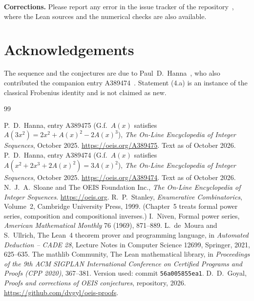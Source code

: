\documentclass[11pt,a4paper]{article}
\theoremstyle{definition}
\theoremstyle{remark}
\newcommand{\para}[1]{\par\medskip\noindent\textbf{#1}\enspace}
\begin{document}
\para{Corrections.} Please report any error in the issue tracker of the repository~\cite{repo}, where the Lean sources and the numerical checks are also
available.

\section*{Acknowledgements}
The sequence and the conjectures are due to Paul~D.~Hanna~\cite{oeis}, who also contributed the companion entry
A389474~\cite{oeisother}. Statement (4.a) is an instance of the classical Frobenius identity and is not claimed as new.

\begin{thebibliography}{99}\small
\raggedright
{} P.~D.~Hanna, entry A389475 (G.f.\ $A(x)$ satisfies $A(3x^2)=2x^2+A(x)^2-2A(x)^3$), \emph{The On-Line Encyclopedia of Integer Sequences}, October 2025. \url{https://oeis.org/A389475}. Text as of October 2026.
 P.~D.~Hanna, entry A389474 (G.f.\ $A(x)$ satisfies $A(x^2+2x^3+2A(x)^2)=3A(x)^2$), \emph{The On-Line Encyclopedia of Integer Sequences}, October 2025. \url{https://oeis.org/A389474}. Text as of October 2026.
 N.~J.~A.~Sloane and The OEIS Foundation Inc., \emph{The On-Line Encyclopedia of Integer Sequences}. \url{https://oeis.org}.
 R.~P.~Stanley, \emph{Enumerative Combinatorics}, Volume~2, Cambridge University Press, 1999. (Chapter~5 treats formal power series, composition and compositional inverses.)
 I.~Niven, Formal power series, \emph{American Mathematical Monthly} 76 (1969), 871--889.
 L.~de~Moura and S.~Ullrich, The Lean~4 theorem prover and programming language, in \emph{Automated Deduction -- CADE 28}, Lecture Notes in Computer Science 12699, Springer, 2021, 625--635.
 The mathlib Community, The Lean mathematical library, in \emph{Proceedings of the 9th ACM SIGPLAN International Conference on Certified Programs and Proofs (CPP 2020)}, 367--381. Version used: commit \texttt{56a005855ea1}.
 D.~D.~Goyal, \emph{Proofs and corrections of OEIS conjectures}, repository, 2026. \url{https://github.com/dvgyl/oeis-proofs}.
\end{thebibliography}
\end{document}

